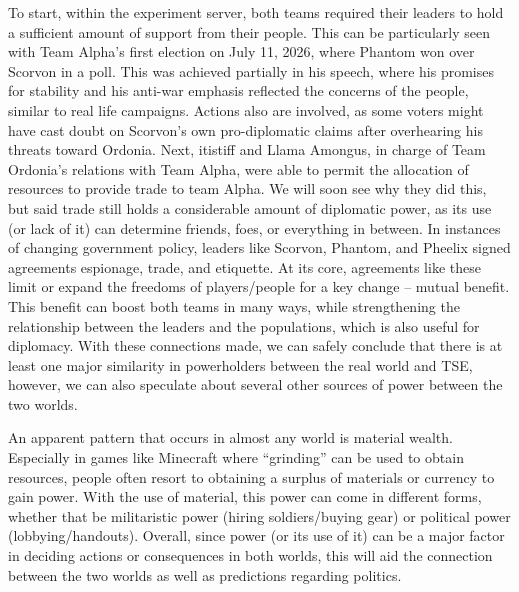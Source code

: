 To start, within the experiment server, both teams required their leaders to hold a sufficient amount of support from their people. This can be particularly seen with Team Alpha’s first election on July 11, 2026, where Phantom won over Scorvon in a poll. This was achieved partially in his speech, where his promises for stability and his anti-war emphasis reflected the concerns of the people, similar to real life campaigns. Actions also are involved, as some voters might have cast doubt on Scorvon’s own pro-diplomatic claims after overhearing his threats toward Ordonia. Next, itistiff and Llama Amongus, in charge of Team Ordonia’s relations with Team Alpha, were able to permit the allocation of resources to provide trade to team Alpha. We will soon see why they did this, but said trade still holds a considerable amount of diplomatic power, as its use (or lack of it) can determine friends, foes, or everything in between. In instances of changing government policy, leaders like Scorvon, Phantom, and Pheelix signed agreements espionage, trade, and etiquette. At its core, agreements like these limit or expand the freedoms of players/people for a key change – mutual benefit. This benefit can boost both teams in many ways, while strengthening the relationship between the leaders and the populations, which is also useful for diplomacy. With these connections made, we can safely conclude that there is at least one major similarity in powerholders between the real world and TSE, however, we can also speculate about several other sources of power between the two worlds.

An apparent pattern that occurs in almost any world is material wealth. Especially in games like Minecraft where “grinding” can be used to obtain resources, people often resort to obtaining a surplus of materials or currency to gain power. With the use of material, this power can come in different forms, whether that be militaristic power (hiring soldiers/buying gear) or political power (lobbying/handouts). Overall, since power (or its use of it) can be a major factor in deciding actions or consequences in both worlds, this will aid the connection between the two worlds as well as predictions regarding politics.


